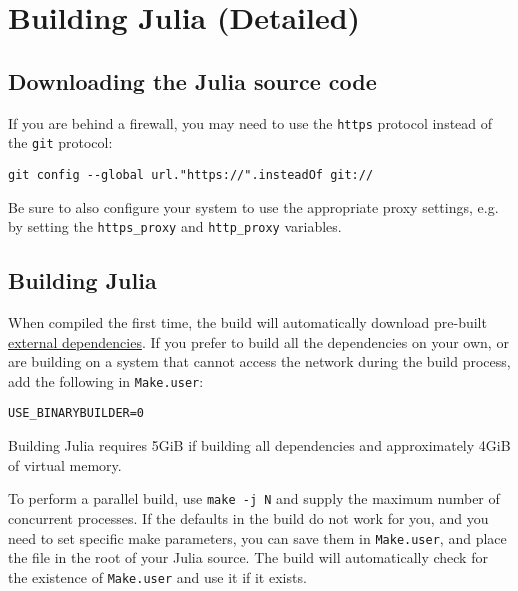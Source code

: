\section{Building Julia (Detailed)}



\hypertarget{18173005634014884273}{}


\subsection{Downloading the Julia source code}



If you are behind a firewall, you may need to use the \texttt{https} protocol instead of the \texttt{git} protocol:




\begin{lstlisting}
git config --global url."https://".insteadOf git://
\end{lstlisting}



Be sure to also configure your system to use the appropriate proxy settings, e.g. by setting the \texttt{https\_proxy} and \texttt{http\_proxy} variables.



\hypertarget{9756497403871169155}{}


\subsection{Building Julia}



When compiled the first time, the build will automatically download pre-built \href{\#required-build-tools-and-external-libraries}{external dependencies}. If you prefer to build all the dependencies on your own, or are building on a system that cannot access the network during the build process, add the following in \texttt{Make.user}:




\begin{lstlisting}
USE_BINARYBUILDER=0
\end{lstlisting}



Building Julia requires 5GiB if building all dependencies and approximately 4GiB of virtual memory.



To perform a parallel build, use \texttt{make -j N} and supply the maximum number of concurrent processes. If the defaults in the build do not work for you, and you need to set specific make parameters, you can save them in \texttt{Make.user}, and place the file in the root of your Julia source. The build will automatically check for the existence of \texttt{Make.user} and use it if it exists.



